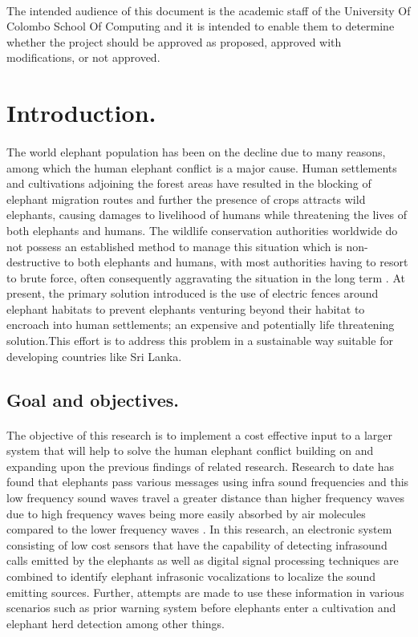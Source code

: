 \documentclass[12pt]{article}
\numberwithin{figure}{section}
\numberwithin{table}{section}
\begin{document}
\paragraph{}
The intended audience of this document is the academic staff of the University Of Colombo School Of Computing and it is intended to enable them to determine whether the project should be approved as proposed, approved with modifications, or not approved.

\newpage
\tableofcontents


\newpage
{}
\newpage
\section{Introduction.}
\paragraph{}
The world elephant population has been on the decline \cite {13} due to many reasons, among which the human elephant conflict is a major cause. Human settlements and cultivations adjoining the forest areas have resulted in the blocking of elephant migration routes and further  the presence of crops attracts wild elephants, causing damages to livelihood of humans while threatening the lives of both elephants and humans. The wildlife conservation authorities worldwide do not possess an established method to manage this situation which is non-destructive to both elephants and humans, with most authorities having to resort to brute force, often consequently aggravating the situation in the long term \cite {13}. At present, the primary solution introduced is the use of electric fences around elephant habitats to prevent elephants venturing beyond their habitat to encroach into human settlements; an expensive and potentially life threatening solution.This effort is to address this problem in a sustainable way suitable for developing countries like Sri Lanka.
\subsection{Goal and objectives.}
\paragraph{}
The objective of this research is to implement  a cost effective input to a larger system that will help to solve the human elephant conflict building on and expanding upon the previous findings of related research. Research to date has found that elephants pass various messages using infra sound frequencies and this low frequency sound waves travel a greater distance than higher frequency waves  due to high frequency waves being more easily absorbed by air molecules compared to the lower frequency waves \cite {5}. In this research, an electronic system consisting of low cost sensors that have the capability of detecting infrasound calls emitted by the elephants as well as digital signal processing techniques are combined to  identify elephant  infrasonic vocalizations to localize the sound emitting sources. Further, attempts are made to use these information in various scenarios such as prior warning system before elephants enter a cultivation and elephant herd detection among other things.
\end{document}
